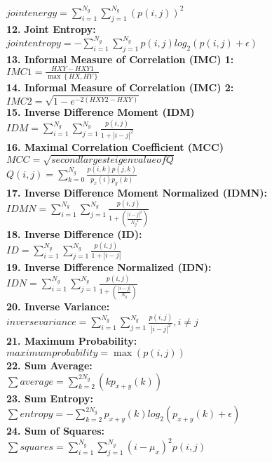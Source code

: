 $\textit{jointenergy}=\sum _{i=1}^{N_{g}}\sum _{j=1}^{N_{g}}\left(p\left(i,j\right)\right)^{2}$\\
\textbf{12.} \textbf{Joint Entropy:}\\
$\textit{jointentropy}=-\sum _{i=1}^{N_{g}}\sum _{j=1}^{N_{g}}p\left(i,j\right)log_{2}\left(p\left(i,j\right)+\epsilon \right)$\\
\textbf{13. Informal Measure of Correlation (IMC) 1:}\\
$IMC1=\frac{HXY-HXY1}{\max \left\{HX,HY\right\}}$\\
\textbf{14. Informal Measure of Correlation (IMC) 2:}\\
$IMC2=\sqrt{1-e^{-2\left(HXY2-HXY\right)}}$\\
\textbf{15. Inverse Difference Moment (IDM)}\\
$IDM=\sum _{i=1}^{N_{g}}\sum _{j=1}^{N_{g}}\frac{p\left(i,j\right)}{1+\left| i-j\right| ^{2}}$\\
\textbf{16. Maximal Correlation Coefficient (MCC)}\\
$MCC=\sqrt{\textit{secondlargesteigenvalueofQ}}$\\
$Q\left(i,j\right)=\sum _{k=0}^{N_{g}}\frac{p\left(i,k\right)p\left(j,k\right)}{p_{x}\left(i\right)p_{y}\left(k\right)}$\\
\textbf{17. Inverse Difference Moment Normalized (IDMN):}\\
$IDMN=\sum _{i=1}^{N_{g}}\sum _{j=1}^{N_{g}}\frac{p\left(i,j\right)}{1+\left(\frac{\left| i-j\right| ^{2}}{{N_{g}}^{2}}\right)}$\\
\textbf{18. Inverse Difference (ID):}\\
$ID=\sum _{i=1}^{N_{g}}\sum _{j=1}^{N_{g}}\frac{p\left(i,j\right)}{1+\left| i-j\right| }$\\
\textbf{19. Inverse Difference Normalized (IDN):}\\
$IDN=\sum _{i=1}^{N_{g}}\sum _{j=1}^{N_{g}}\frac{p\left(i,j\right)}{1+\left(\frac{\left| i-j\right| }{N_{g}}\right)}$\\
\textbf{20. Inverse Variance:}\\
$\textit{inversevariance}=\sum _{i=1}^{N_{g}}\sum _{j=1}^{N_{g}}\frac{p\left(i,j\right)}{\left| i-j\right| ^{2}} ,i\neq j $\\
\textbf{21. Maximum Probability:}\\
$\textit{maximumprobability}=\max \left(p\left(i,j\right)\right)$\\
\textbf{22. Sum Average:}\\
$\sum \textit{average}=\sum _{k=2}^{2N_{g}}\left(kp_{x+y}\left(k\right)\right)$\\
\textbf{23. Sum Entropy:}\\
$\sum \textit{entropy}=-\sum _{k=2}^{2N_{g}}p_{x+y}\left(k\right)log_{2}\left(p_{x+y}\left(k\right)+\epsilon \right)$\\
\textbf{24. Sum of Squares:}\\
$\sum \textit{squares}=\sum _{i=1}^{N_{g}}\sum _{j=1}^{N_{g}}\left(i-\mu _{x}\right)^{2}p\left(i,j\right)$


